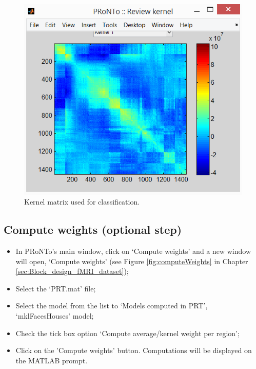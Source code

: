 \begin{itemize}
\begin{figure}[!h]
	\centering
		\includegraphics[scale=0.7]{images/Tutorial/mkl/reviewKernelmkl.png}
	\caption{Kernel matrix used for classification.}
	\label{fig:reviewKernelmkl}
\end{figure}

\end{itemize}


\subsection{Compute weights (optional step)}

\begin{itemize}
\item In PRoNTo's main window, click on `Compute weights' and a new window will open, `Compute weights' (see Figure \ref{fig:computeWeights} in Chapter \ref{sec:Block_design_fMRI_dataset}); 

\item Select the `PRT.mat' file;

\item Select the model from the list to `Models computed in PRT', `mklFacesHouses' model;

\item Check the tick box option `Compute average/kernel weight per region';

\item Click on the 'Compute weights' button. Computations will be displayed on the MATLAB prompt.

\end{itemize}

